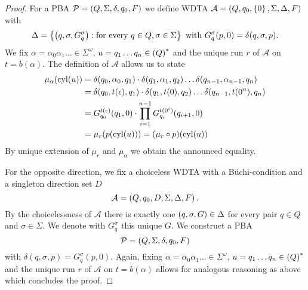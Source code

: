 \begin{proof}
  For a \ac{PBA} $\mathcal{P} = \left(Q, \Sigma, \delta, q_{0}, F\right)$ we define
  \ac{WDTA} $\mathcal{A} = \left(Q, q_{0}, \left\{0\right\}, \Sigma, \Delta, F\right)$ with
  \begin{equation*}
    \Delta = \left\{
      \left(q,\sigma,G_{q}^{\sigma}\right):\text{for every }q\in Q,\sigma\in\Sigma
    \right\}\text{ with }G_{q}^{\sigma}(p, 0) = \delta(q,\sigma,p).
  \end{equation*}
  We fix $\alpha = \alpha_{0}\alpha_{1}\dots\in\Sigma^{\omega}$,
  $u = q_{1}\dots q_{n}\in\left(Q\right)^{*}$ and the unique run $r$ of
  $\mathcal{A}$ on $t = b(\alpha)$. The definition of $\mathcal{A}$ allows us
  to state
  \begin{align*}
    \mu_{\alpha}(\operatorname{cyl}(u)) &=\delta(q_{0},\alpha_{0},q_{1})\cdot
      \delta(q_{1},\alpha_{1},q_{2})\dots\delta(q_{n-1},\alpha_{n-1},q_{n})\\
    &=\delta(q_{0},t(\epsilon),q_{1})\cdot
      \delta(q_{1},t(0),q_{2})\dots
      \delta(q_{n-1},t(0^{n}),q_{n})\\
    &= G_{q_{0}}^{t(\epsilon)}(q_{1},0)\cdot
      \prod\limits_{i=1}^{n-1}G_{q_{i}}^{t(0^{i})}(q_{i+1}, 0)\\
    &= \mu_{r}(p(\operatorname{cyl}(u))) = (\mu_{r}\circ p)(\operatorname{cyl}(u))
  \end{align*}
  By unique extension of $\mu_{r}$ and $\mu_{\alpha}$ we obtain the announced
  equality.

  For the opposite direction, we fix a choiceless \ac{WDTA} with a 
  Büchi-condition and a singleton direction set $D$
  \begin{equation*}
    \mathcal{A} = \left(Q, q_{0}, D , \Sigma, \Delta, F\right).
  \end{equation*}
  By the choicelessness of $\mathcal{A}$ there is exactly one 
  $\left(q,\sigma, G\right)\in\Delta$ for every pair $q\in Q$ and $\sigma\in\Sigma$.
  We denote with $G_{q}^{\sigma}$ this unique $G$. We construct a \ac{PBA}
  \begin{equation*}
    \mathcal{P} = \left(Q, \Sigma, \delta, q_{0}, F\right)
  \end{equation*}
  with $\delta(q,\sigma, p) = G_{q}^{\sigma}(p, 0)$. Again, fixing
  $\alpha = \alpha_{0}\alpha_{1}\dots\in\Sigma^{\omega}$,
  $u = q_{1}\dots q_{n}\in\left(Q\right)^{*}$ and the unique run $r$ of
  $\mathcal{A}$ on $t = b(\alpha)$ allows for analogous reasoning as above
  which concludes the proof.
\end{proof}

